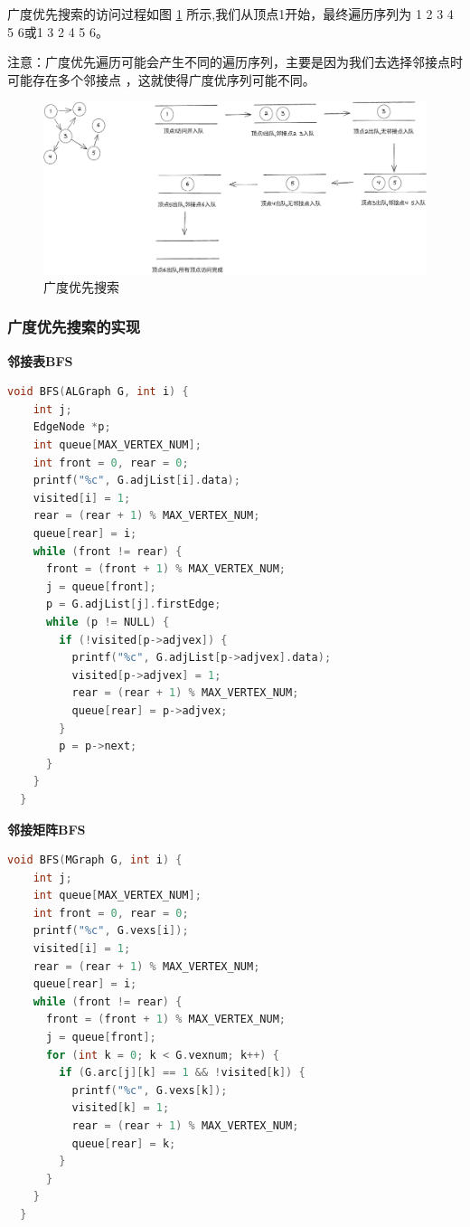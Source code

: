 \documentclass[lang=cn,newtx,10pt,scheme=chinese]{../elegantbook}
\begin{document}
广度优先搜索的访问过程如图 \ref{fig:breadthFirst} 所示,我们从顶点1开始，最终遍历序列为 1 2 3 4 5 6或1 3 2 4 5 6。

注意：广度优先遍历可能会产生不同的遍历序列，主要是因为我们去选择邻接点时可能存在多个邻接点 ，这就使得广度优序列可能不同。

\begin{figure}[!htbp]
  \centering
  \includegraphics[width=1\textwidth]{./figure/pdf/cropped/breadthFirst.pdf}
  \caption{广度优先搜索}
  \label{fig:breadthFirst}
\end{figure}


\subsubsection{广度优先搜索的实现}

\textbf{邻接表BFS}

\begin{lstlisting}[language=C++, caption={邻接表BFS}]
  void BFS(ALGraph G, int i) {
    int j;
    EdgeNode *p;
    int queue[MAX_VERTEX_NUM];
    int front = 0, rear = 0;
    printf("%c", G.adjList[i].data);
    visited[i] = 1;
    rear = (rear + 1) % MAX_VERTEX_NUM;
    queue[rear] = i;
    while (front != rear) {
      front = (front + 1) % MAX_VERTEX_NUM;
      j = queue[front];
      p = G.adjList[j].firstEdge;
      while (p != NULL) {
        if (!visited[p->adjvex]) {
          printf("%c", G.adjList[p->adjvex].data);
          visited[p->adjvex] = 1;
          rear = (rear + 1) % MAX_VERTEX_NUM;
          queue[rear] = p->adjvex;
        }
        p = p->next;
      }
    }
  }

\end{lstlisting}

\textbf{邻接矩阵BFS}

\begin{lstlisting}[language=C++, caption={邻接矩阵BFS}]
  void BFS(MGraph G, int i) {
    int j;
    int queue[MAX_VERTEX_NUM];
    int front = 0, rear = 0;
    printf("%c", G.vexs[i]);
    visited[i] = 1;
    rear = (rear + 1) % MAX_VERTEX_NUM;
    queue[rear] = i;
    while (front != rear) {
      front = (front + 1) % MAX_VERTEX_NUM;
      j = queue[front];
      for (int k = 0; k < G.vexnum; k++) {
        if (G.arc[j][k] == 1 && !visited[k]) {
          printf("%c", G.vexs[k]);
          visited[k] = 1;
          rear = (rear + 1) % MAX_VERTEX_NUM;
          queue[rear] = k;
        }
      }
    }
  }
\end{lstlisting}
\end{document}
